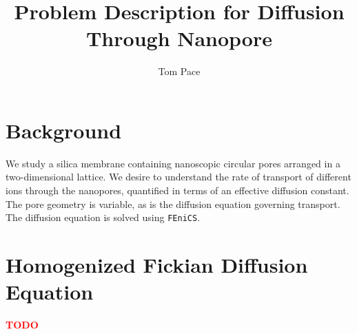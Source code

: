 \documentclass{article}
\begin{document}
\title{Problem Description for Diffusion Through Nanopore}
\author{Tom Pace}
\maketitle

\tableofcontents

\section{Background}\label{sec:background}

We study a silica membrane containing nanoscopic circular pores arranged in a two-dimensional lattice.
We desire to understand the rate of transport of different ions through the nanopores,
quantified in terms of an effective diffusion constant.
The pore geometry is variable, as is the diffusion equation governing transport.
The diffusion equation is solved using \texttt{FEniCS}.










\section{Homogenized Fickian Diffusion Equation}\label{sec:hom_fick}

\textcolor{red}{\textbf{TODO}}
\end{document}
